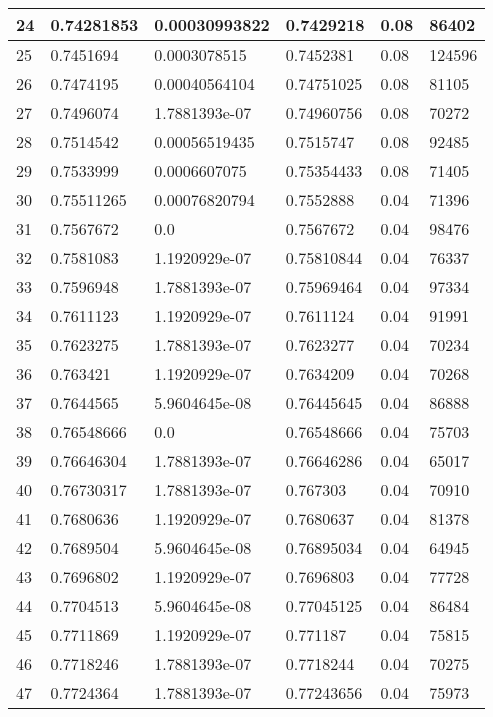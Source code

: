 \begin{longtable}{|l|l|l|l|l|l|}
24 & 0.74281853 & 0.00030993822 & 0.7429218 & 0.08 & 86402 \\ \hline 
25 & 0.7451694 & 0.0003078515 & 0.7452381 & 0.08 & 124596 \\ \hline 
26 & 0.7474195 & 0.00040564104 & 0.74751025 & 0.08 & 81105 \\ \hline 
27 & 0.7496074 & 1.7881393e-07 & 0.74960756 & 0.08 & 70272 \\ \hline 
28 & 0.7514542 & 0.00056519435 & 0.7515747 & 0.08 & 92485 \\ \hline 
29 & 0.7533999 & 0.0006607075 & 0.75354433 & 0.08 & 71405 \\ \hline 
30 & 0.75511265 & 0.00076820794 & 0.7552888 & 0.04 & 71396 \\ \hline 
31 & 0.7567672 & 0.0 & 0.7567672 & 0.04 & 98476 \\ \hline 
32 & 0.7581083 & 1.1920929e-07 & 0.75810844 & 0.04 & 76337 \\ \hline 
33 & 0.7596948 & 1.7881393e-07 & 0.75969464 & 0.04 & 97334 \\ \hline 
34 & 0.7611123 & 1.1920929e-07 & 0.7611124 & 0.04 & 91991 \\ \hline 
35 & 0.7623275 & 1.7881393e-07 & 0.7623277 & 0.04 & 70234 \\ \hline 
36 & 0.763421 & 1.1920929e-07 & 0.7634209 & 0.04 & 70268 \\ \hline 
37 & 0.7644565 & 5.9604645e-08 & 0.76445645 & 0.04 & 86888 \\ \hline 
38 & 0.76548666 & 0.0 & 0.76548666 & 0.04 & 75703 \\ \hline 
39 & 0.76646304 & 1.7881393e-07 & 0.76646286 & 0.04 & 65017 \\ \hline 
40 & 0.76730317 & 1.7881393e-07 & 0.767303 & 0.04 & 70910 \\ \hline 
41 & 0.7680636 & 1.1920929e-07 & 0.7680637 & 0.04 & 81378 \\ \hline 
42 & 0.7689504 & 5.9604645e-08 & 0.76895034 & 0.04 & 64945 \\ \hline 
43 & 0.7696802 & 1.1920929e-07 & 0.7696803 & 0.04 & 77728 \\ \hline 
44 & 0.7704513 & 5.9604645e-08 & 0.77045125 & 0.04 & 86484 \\ \hline 
45 & 0.7711869 & 1.1920929e-07 & 0.771187 & 0.04 & 75815 \\ \hline 
46 & 0.7718246 & 1.7881393e-07 & 0.7718244 & 0.04 & 70275 \\ \hline 
47 & 0.7724364 & 1.7881393e-07 & 0.77243656 & 0.04 & 75973 \\ \hline 

\end{longtable}
